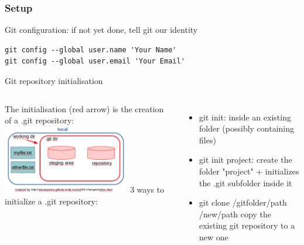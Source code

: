 \begin{frame}[containsverbatim]
\frametitle{ Setup}
\begin{block}{Git configuration: if not yet done, tell git our identity}
\begin{lstlisting}
git config --global user.name 'Your Name'
git config --global user.email 'Your Email'
\end{lstlisting}
\end{block}
\begin{block}{Git repository initialisation}
\begin{columns}
   The initialisation (red arrow) is the creation of a .git repository:
   \includegraphics[height=3cm]{05_history/Images/FAIR_git_init.png}
   3 ways to initialize a .git repository:
   \begin{itemize}
       \item git init: inside an existing folder (possibly containing files)
       \item git init project: create the folder "project" + initializes the .git subfolder inside it
       \item git clone /gitfolder/path /new/path copy the existing git repository to a new one
    \end{itemize}
\end{columns}
\end{block}
\end{frame}
